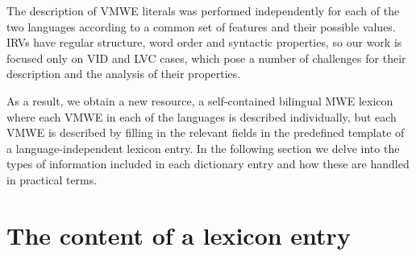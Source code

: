 \documentclass[output=paper,colorlinks,citecolor=brown]{langscibook}
\begin{document}
The description of VMWE literals was performed independently for each of the two languages according to a common set of features and their possible values. IRVs have regular structure, word order and syntactic properties, so our work is focused only on VID and LVC cases, which pose a number of challenges for their description and the analysis of their properties. 
   
As a result, we obtain a new resource, a self-contained bilingual MWE lexicon where each VMWE in each of the languages is described individually, but each VMWE is described by filling in the relevant fields in the predefined template of a language-independent lexicon entry. In the following section %
we delve into the types of information included in each dictionary entry and how these are handled in practical terms.



\section{The content of a lexicon entry} \label{sec:entry}\largerpage
\end{document}
